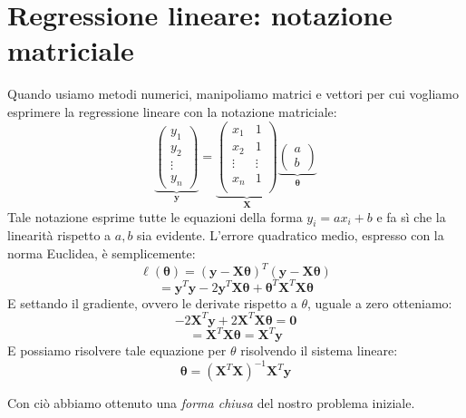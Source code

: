 \documentclass{article}
\begin{document}
    \section{Regressione lineare: notazione matriciale}
        Quando usiamo metodi numerici, manipoliamo matrici e vettori per cui vogliamo esprimere la regressione lineare con la notazione 
        matriciale:
        \[ \underbrace{\begin{pmatrix}
            y_1 \\
            y_2 \\
            \vdots \\
            y_n
        \end{pmatrix}}_\mathbf{y} = \underbrace{\begin{pmatrix}
            x_1 & 1 \\
            x_2 & 1 \\
            \vdots & \vdots \\
            x_n & 1 \\
        \end{pmatrix}}_\mathbf{X} \underbrace{\begin{pmatrix}
            a \\
            b
        \end{pmatrix}}_\mathbf{\theta}\]
    Tale notazione esprime tutte le equazioni della forma $y_i = ax_i + b$ e fa sì che la linearità rispetto a $a,b$ sia evidente. L'errore
    quadratico medio, espresso con la norma Euclidea, è semplicemente:
        \[ \ell(\mathbf{\theta}) = (\mathbf{y} - \mathbf{X\theta})^T (\mathbf{y} - \mathbf{X\theta}) \]
        \[ = \mathbf{y}^T \mathbf{y} - 2\mathbf{y}^T\mathbf{X\theta} + \mathbf{\theta}^T \mathbf{X}^T\mathbf{X\theta} \]
        E settando il gradiente, ovvero le derivate rispetto a $\theta$, uguale a zero otteniamo:
        \[ -2\mathbf{X}^T\mathbf{y} + 2\mathbf{X}^T\mathbf{X\theta} = \mathbf{0} \]
        \[ = \mathbf{X}^T\mathbf{X\theta} = \mathbf{X}^T\mathbf{y}\]
        E possiamo risolvere tale equazione per $\theta$ risolvendo il sistema lineare:
        \[\mathbf{\theta} = (\mathbf{X}^T\mathbf{X})^{-1}\mathbf{X}^T\mathbf{y}\]

        Con ciò abbiamo ottenuto una \emph{forma chiusa} del nostro problema iniziale.
\end{document}
